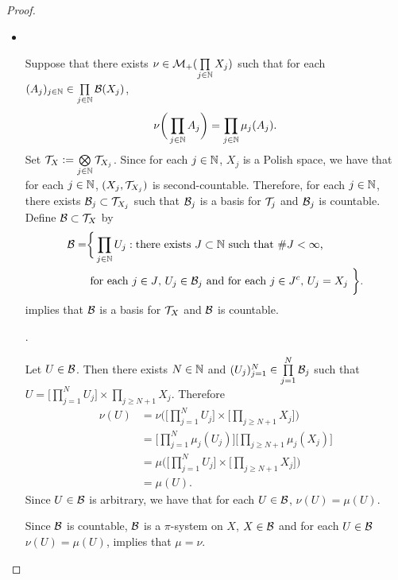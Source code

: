 \documentclass{book}
\begin{document}
\begin{proof}
\begin{itemize}
			
			
			
			
			
			
			
			
			
			\item {} \\
			
			Suppose that there exists $\nu \in \mathcal{M}_+(\prod\limits_{j \in \mathbb{N}} X_j)$ such that for each $(A_j)_{j \in \mathbb{N}} \in \prod\limits_{j \in \mathbb{N}} \mathcal{B}(X_j)$, 
			$$\nu \bigg(\prod_{j \in \mathbb{N}} A_j \bigg) = \prod_{j \in \mathbb{N}} \mu_j(A_j).$$
			Set $\mathcal{T}_X \vcentcolon= \bigotimes\limits_{j \in \mathbb{N}} \mathcal{T}_{X_j}$. Since for each $j \in \mathbb{N}$, $X_j$ is a Polish space, we have that for each $j \in \mathbb{N}$, $(X_j, \mathcal{T}_{X_j})$ is second-countable. Therefore, for each $j \in \mathbb{N}$, there exists $\mathcal{B}_j \subset \mathcal{T}_{X_j}$ such that $\mathcal{B}_j$ is a basis for $\mathcal{T}_j$ and $\mathcal{B}_j$ is countable. Define $\mathcal{B} \subset \mathcal{T}_X$ by 
			\begin{align*}
				\mathcal{B} = 
				& \bigg \{\prod_{j \in \mathbb{N}} U_j: \text{there exists $J \subset \mathbb{N}$ such that $ \# J < \infty$, } \\
				& \text{ for each $j \in J$, $U_j \in \mathcal{B}_j$ and for each $j \in J^c$, $U_j = X_j$ } \bigg \}.
			\end{align*} 
			 implies that $\mathcal{B}$ is a basis for $\mathcal{T}_X$ and $\mathcal{B}$ is countable. 
			
			. 
			
			Let $U \in \mathcal{B}$. Then there exists $N \in \mathbb{N}$ and $(U_j)_{j=1}^N \in \prod\limits_{j=1}^N \mathcal{B}_j$ such that $U = \bigg[ \prod\limits_{j=1}^N U_j \bigg] \times \prod\limits_{j \geq N+1} X_j$. Therefore 
			\begin{align*}
				\nu(U)
				& = \nu \bigg( \bigg[ \prod\limits_{j=1}^N U_j \bigg] \times \bigg[ \prod\limits_{j \geq N+1} X_j \bigg] \bigg) \\
				& = \bigg[ \prod\limits_{j=1}^N \mu_j(U_j) \bigg]  \bigg[\prod\limits_{j \geq N+1} \mu_j(X_j) \bigg] \\
				& = \mu \bigg( \bigg[ \prod\limits_{j=1}^N U_j \bigg] \times \bigg[ \prod\limits_{j \geq N+1} X_j \bigg] \bigg) \\
				& = \mu(U).
			\end{align*}
			Since $U \in \mathcal{B}$ is arbitrary, we have that for each $U \in \mathcal{B}$, $\nu(U) = \mu(U)$.
			
			Since $\mathcal{B}$ is countable, $\mathcal{B}$ is a $\pi$-system on $X$, $X \in \mathcal{B}$ and for each $U \in \mathcal{B}$ $\nu(U) = \mu(U)$,  implies that $\mu = \nu$. 
			
		\end{itemize}
	\end{proof}
	
\end{document}
